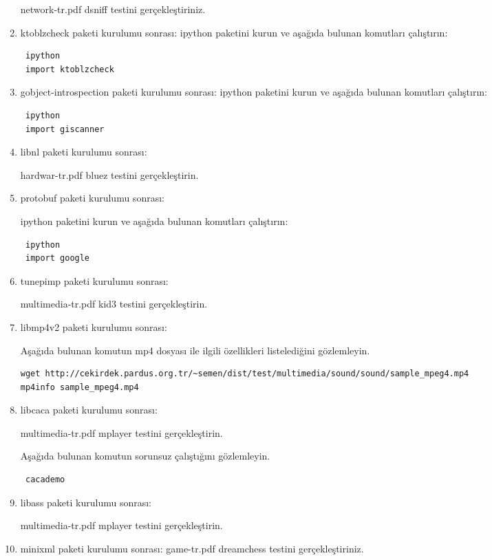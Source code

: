 \documentclass[a4paper,10pt]{article}
\begin{document}
\begin{enumerate}
network-tr.pdf dsniff testini gerçekleştiriniz.

\item ktoblzcheck paketi kurulumu sonrası:
ipython paketini kurun ve aşağıda bulunan komutları çalıştırın:
\begin{verbatim}
 ipython
 import ktoblzcheck
\end{verbatim}


\item gobject-introspection paketi kurulumu sonrası:
ipython paketini kurun ve aşağıda bulunan komutları çalıştırın:
\begin{verbatim}
 ipython
 import giscanner
\end{verbatim}


\item libnl paketi kurulumu sonrası:

hardwar-tr.pdf bluez testini gerçekleştirin.
\item protobuf paketi kurulumu sonrası:

ipython paketini kurun ve aşağıda bulunan komutları çalıştırın:
\begin{verbatim}
 ipython
 import google
\end{verbatim}
\item tunepimp paketi kurulumu sonrası:

multimedia-tr.pdf kid3 testini gerçekleştirin.

\item libmp4v2 paketi kurulumu sonrası:

Aşağıda bulunan komutun mp4 dosyası ile ilgili özellikleri listelediğini gözlemleyin.
\begin{verbatim}
wget http://cekirdek.pardus.org.tr/~semen/dist/test/multimedia/sound/sound/sample_mpeg4.mp4
mp4info sample_mpeg4.mp4 
\end{verbatim}

\item libcaca paketi kurulumu sonrası:

multimedia-tr.pdf mplayer testini gerçekleştirin.

Aşağıda bulunan komutun sorunsuz çalıştığını gözlemleyin.
\begin{verbatim}
 cacademo
\end{verbatim}


\item libass paketi kurulumu sonrası:

multimedia-tr.pdf mplayer testini gerçekleştirin.

\item minixml paketi kurulumu sonrası:
game-tr.pdf dreamchess testini gerçekleştiriniz.


\end{enumerate}
\end{document}
